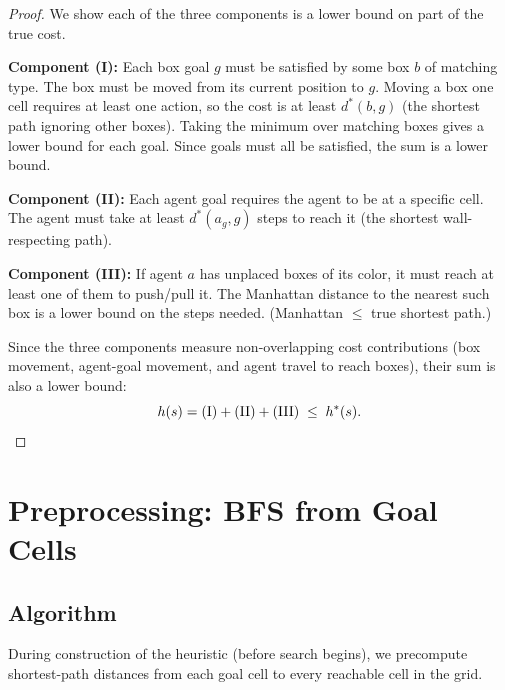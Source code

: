 \documentclass[11pt, a4paper]{article}
\begin{document}
\begin{proof}
We show each of the three components is a lower bound on part of the true cost.

\textbf{Component (I):} Each box goal $g$ must be satisfied by some box $b$ of matching type. The box must be moved from its current position to $g$. Moving a box one cell requires at least one action, so the cost is at least $d^*(b, g)$ (the shortest path ignoring other boxes). Taking the minimum over matching boxes gives a lower bound for each goal. Since goals must all be satisfied, the sum is a lower bound.

\textbf{Component (II):} Each agent goal requires the agent to be at a specific cell. The agent must take at least $d^*(a_g, g)$ steps to reach it (the shortest wall-respecting path).

\textbf{Component (III):} If agent $a$ has unplaced boxes of its color, it must reach at least one of them to push/pull it. The Manhattan distance to the nearest such box is a lower bound on the steps needed. (Manhattan $\leq$ true shortest path.)

Since the three components measure non-overlapping cost contributions (box movement, agent-goal movement, and agent travel to reach boxes), their sum is also a lower bound:
\[
    h(s) = \text{(I)} + \text{(II)} + \text{(III)} \;\leq\; h^*(s). \qedhere
\]
\end{proof}

\section{Preprocessing: BFS from Goal Cells}

\subsection{Algorithm}

During construction of the heuristic (before search begins), we precompute shortest-path distances from each goal cell to every reachable cell in the grid.
\end{document}
